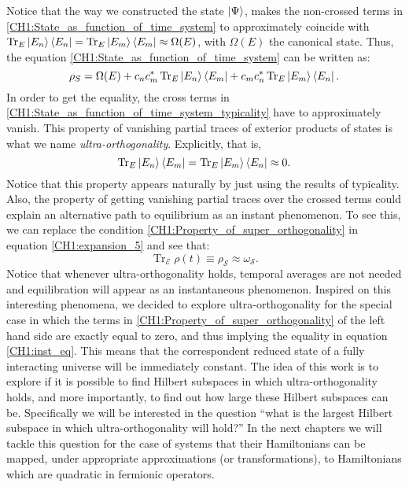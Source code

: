 \indent  Notice that the way we constructed the state $\mathinner{|{\Psi}\rangle}$, makes the non-crossed terms in \eqref{CH1:State_as_function_of_time_system} to approximately  coincide with $\operatorname{Tr}_E \mathinner{|{E_n}\rangle}\mathinner{\langle{E_n}|} =\operatorname{Tr}_E \mathinner{|{E_m}\rangle}\mathinner{\langle{E_m}|} \approx \Omega(E)$, with $\Omega(E)$ the canonical state. Thus, the equation \eqref{CH1:State_as_function_of_time_system} can be written as:
\begin{equation}
\rho_S= \Omega(E) + c_n c^{*}_m  \operatorname{Tr}_E \mathinner{|{E_n}\rangle}\mathinner{\langle{E_m}|} + c_m c^{*}_n \operatorname{Tr}_E \mathinner{|{E_m}\rangle}\mathinner{\langle{E_n}|}.
\label{CH1:State_as_function_of_time_system_typicality}
\end{equation}
In order to get the equality, the cross terms in \eqref{CH1:State_as_function_of_time_system_typicality} have to  approximately vanish. This property of vanishing partial traces of exterior products of states is what we name \textit{ultra-orthogonality}. Explicitly, that is,
\begin{equation}
\operatorname{Tr}_E \mathinner{|{E_n}\rangle}\mathinner{\langle{E_m}|} = \operatorname{Tr}_E \mathinner{|{E_m}\rangle}\mathinner{\langle{E_n}|} \approx  0.
\label{CH1:Property_of_super_orthogonality}
\end{equation}
Notice that this property appears naturally by just using the results of typicality. Also, the property of getting vanishing partial traces over the crossed terms could explain an alternative path to equilibrium as an instant phenomenon. To see this, we can replace the condition \eqref{CH1:Property_of_super_orthogonality} in equation \eqref{CH1:expansion_5} and see that:
\begin{equation}
\operatorname{Tr}_{\mathcal{E}}\rho(t)\equiv \rho_{\mathcal{S}} \approx \omega_{\mathcal{S}}.
\label{CH1:inst_eq}
\end{equation}
Notice that whenever ultra-orthogonality holds, temporal averages are not needed and equilibration will appear as an instantaneous phenomenon. Inspired on this interesting phenomena, we decided to explore ultra-orthogonality for the special case in which the terms in \eqref{CH1:Property_of_super_orthogonality} of the left hand side are exactly equal to zero, and thus implying the equality in equation \eqref{CH1:inst_eq}. This means that the correspondent reduced state of a fully interacting universe will be immediately constant. The idea of this work is to explore if it is possible to find Hilbert subspaces in which ultra-orthogonality holds, and more importantly, to find out how large these Hilbert subspaces can be. Specifically we will be interested in the question ``what is the largest Hilbert subspace in which ultra-orthogonality will hold?'' In the next chapters we will tackle this question for the case of systems that their Hamiltonians can be mapped, under appropriate approximations (or transformations), to Hamiltonians which are quadratic in fermionic operators.

